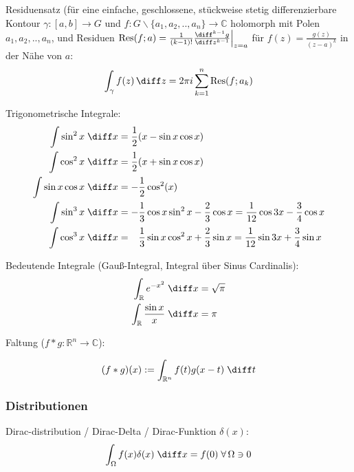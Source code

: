 \documentclass[11pt]{article}
\numberwithin{equation}{section}
\begin{document}
        Residuensatz (für eine einfache, geschlossene, stückweise stetig differenzierbare Kontour $\gamma:\left[a,b\right]\rightarrow G$ und $f:G\backslash\lbrace a_1, a_2, .., a_n\rbrace \rightarrow \mathbb{C}$ holomorph mit Polen $a_1, a_2, .., a_n$, und Residuen $\mathrm{Res}(f; a) = \frac{1}{(k-1)!}\frac{\diff^{k-1} g}{\diff z^{k-1}}\Big|_{z=a}$ für $f(z)=\frac{g(z)}{(z-a)^k}$ in der Nähe von $a$:
        \begin{equation}
          \int_\gamma f(z)\,\diff z = 2\pi i \sum_{k=1}^{n} \mathrm{Res}(f; a_k)
        \end{equation}

  			Trigonometrische Integrale:
  			\begin{equation}
  				\begin{split}
  					\int \sin^2 x\;\diff x &= \frac{1}{2}( x-\sin  x\cos  x) \\
  					\int \cos^2 x\;\diff x &= \frac{1}{2}( x+\sin  x\cos  x) \\
  					\int{\sin x\cos x\;\diff x} &= -\frac{1}{2}\cos^2( x) \\
  					\int \sin^3 x\;\diff x &= -\frac{1}{3}\cos{ x}\sin^2{ x}-\frac{2}{3}\cos{ x}
            = \frac{1}{12}\cos{3 x}-\frac{3}{4}\cos{ x} \\
  					\int \cos^3 x\;\diff x &= \phantom{-}\frac{1}{3}\sin x \cos^2 x+\frac{2}{3}\sin  x
            = \frac{1}{12}\sin{3 x}+\frac{3}{4}\sin{ x} \\
  				\end{split}
  			\end{equation}

        Bedeutende Integrale (Gauß-Integral, Integral über Sinus Cardinalis):
        \begin{equation}
          \begin{aligned}
            \int_\mathbb{R} e^{-x^2}\;\diff x &= \sqrt{\pi} \\
            \int_\mathbb{R} \frac{\sin x}{x}\;\diff x &= \pi \\
          \end{aligned}
        \end{equation}

        Faltung ($f*g:\mathbb{R}^n \rightarrow \mathbb{C}$):

        \begin{equation}
          (f*g)(x) := \int_{\mathbb{R}^n} f(t) g(x-t)\;\diff t
        \end{equation}

      \subsubsection{Distributionen}
        Dirac-distribution / Dirac-Delta / Dirac-Funktion $\delta(x)$:
        \begin{equation}
          \int_\Omega f(x)\delta(x)\;\diff x = f(0)\;\forall\, \Omega\ni 0
        \end{equation}
\end{document}
